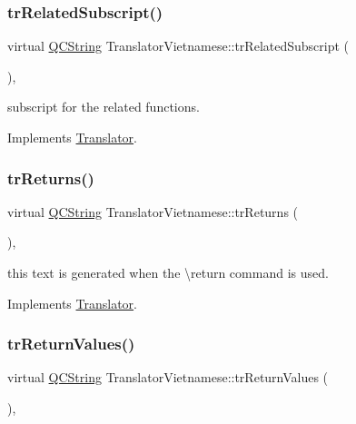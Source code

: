 \subsubsection{\texorpdfstring{trRelatedSubscript()}{trRelatedSubscript()}}
{\footnotesize\ttfamily virtual \mbox{\hyperlink{class_q_c_string}{Q\+C\+String}} Translator\+Vietnamese\+::tr\+Related\+Subscript (\begin{DoxyParamCaption}{ }\end{DoxyParamCaption})\hspace{0.3cm}{\ttfamily [inline]}, {\ttfamily [virtual]}}

subscript for the related functions. 

Implements \mbox{\hyperlink{class_translator}{Translator}}.

\mbox{\label{class_translator_vietnamese_a09c5d21b1c03da3370d8cd5024a6bd6b}} 
\subsubsection{\texorpdfstring{trReturns()}{trReturns()}}
{\footnotesize\ttfamily virtual \mbox{\hyperlink{class_q_c_string}{Q\+C\+String}} Translator\+Vietnamese\+::tr\+Returns (\begin{DoxyParamCaption}{ }\end{DoxyParamCaption})\hspace{0.3cm}{\ttfamily [inline]}, {\ttfamily [virtual]}}

this text is generated when the \textbackslash{}return command is used. 

Implements \mbox{\hyperlink{class_translator}{Translator}}.

\mbox{\label{class_translator_vietnamese_aa356fe633dabe2485060a0ff7a8f0190}} 
\subsubsection{\texorpdfstring{trReturnValues()}{trReturnValues()}}
{\footnotesize\ttfamily virtual \mbox{\hyperlink{class_q_c_string}{Q\+C\+String}} Translator\+Vietnamese\+::tr\+Return\+Values (\begin{DoxyParamCaption}{ }\end{DoxyParamCaption})\hspace{0.3cm}{\ttfamily [inline]}, {\ttfamily [virtual]}}

